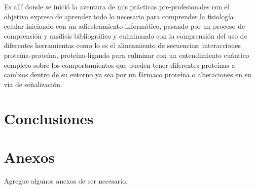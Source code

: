 \documentclass[a4paper,12pt]{article}
\begin{document}
Es allí donde se inició la aventura de mis prácticas pre-profesionales con el objetivo expreso de aprender todo lo necesario para comprender la fisiología celular iniciando con un adiestramiento informático, pasando por un proceso de comprensión y análisis bibliográfico y culminando con la comprensión del uso de diferentes herramientas como lo es el alineamiento de secuencias, interacciones proteína-proteína, proteína-ligando para culminar con un entendimiento cuántico completo sobre los comportamientos que pueden tener diferentes proteínas a cambios dentro de su entorno ya sea por un fármaco proteína o alteraciones en su via de señalización.


\section{Conclusiones}






\section{Anexos}
Agregue algunos anexos de ser necesario.
\end{document}
